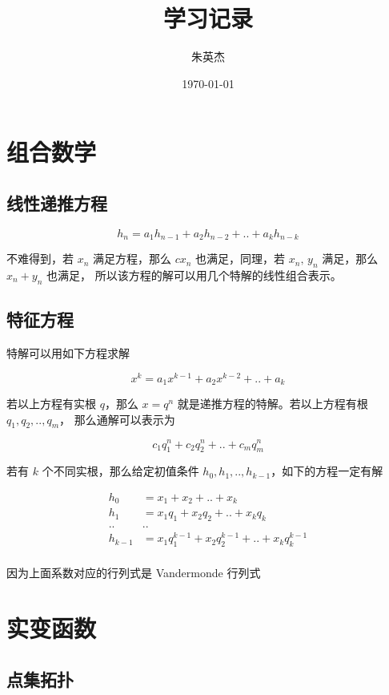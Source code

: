 \documentclass[12pt,a4paper]{ctexart}
\title{学习记录}
\author{朱英杰}
\date{\today}
\begin{document}
\maketitle
\tableofcontents

\section{组合数学}

\subsection{线性递推方程}

\[
h_n = a_1h_{n-1} + a_2h_{n-2} + .. +a_kh_{n-k}
\]

不难得到，若 $x_n$ 满足方程，那么 $c x_n$ 也满足，同理，若 $x_n,\, y_n$ 满足，那么 $x_n + y_n$ 也满足，
所以该方程的解可以用几个特解的线性组合表示。

\subsection{特征方程}

特解可以用如下方程求解

\[
x^k = a_1x^{k-1} + a_2x^{k-2} + .. + a_k
\]

若以上方程有实根 $q$，那么 $x = q^n$ 就是递推方程的特解。若以上方程有根 $q_1,q_2,..,q_m$，
那么通解可以表示为

\[
c_1q_1^n + c_2q_2^n + .. + c_mq_m^n
\]

若有 $k$ 个不同实根，那么给定初值条件 $h_0, h_1, .., h_{k-1}$，如下的方程一定有解

\begin{align*}
    h_0 &= x_1 + x_2 + .. + x_k \\
    h_1 &= x_1q_1 + x_2q_2 + .. + x_kq_k \\
    .. & .. \\
    h_{k-1} &= x_1q_1^{k-1} + x_2q_2^{k-1} + .. + x_kq_k^{k-1} \\
\end{align*}

因为上面系数对应的行列式是 Vandermonde 行列式

\section{实变函数}

\subsection{点集拓扑}
\end{document}
